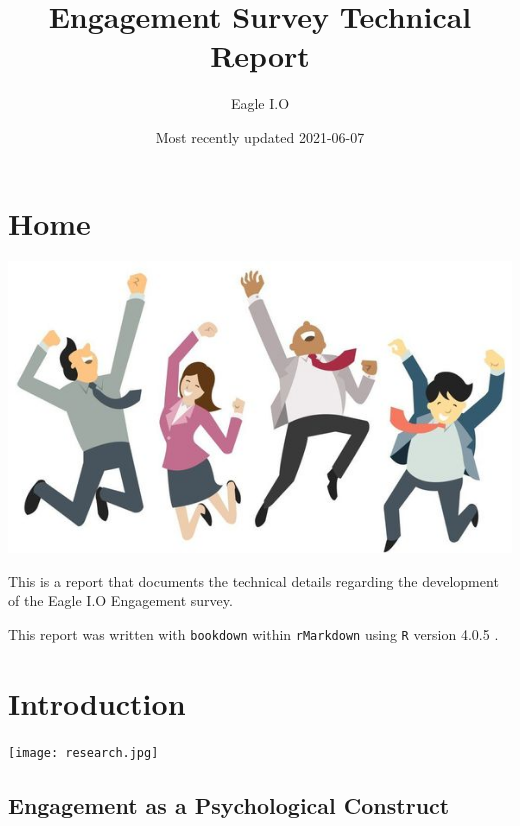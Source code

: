 \documentclass[
]{book}
\title{Engagement Survey Technical Report}
\author{Eagle I.O}
\date{Most recently updated 2021-06-07}
\begin{document}
\maketitle

{
\setcounter{tocdepth}{4}
\tableofcontents
}
\hypertarget{home}{%
\chapter*{Home}\label{home}}

\includegraphics{EE.jpeg}

This is a report that documents the technical details regarding the development of the Eagle I.O Engagement survey.

This report was written with \texttt{bookdown} \citep{R-bookdown} within \texttt{rMarkdown} \citep{R-markdown} using \texttt{R} version 4.0.5 \citep{R-base}.

\hypertarget{intro}{%
\chapter{Introduction}\label{intro}}

\texttt{[image: research.jpg]}

\hypertarget{engagement-as-a-psychological-construct}{%
\section{Engagement as a Psychological Construct}\label{engagement-as-a-psychological-construct}}
\end{document}
